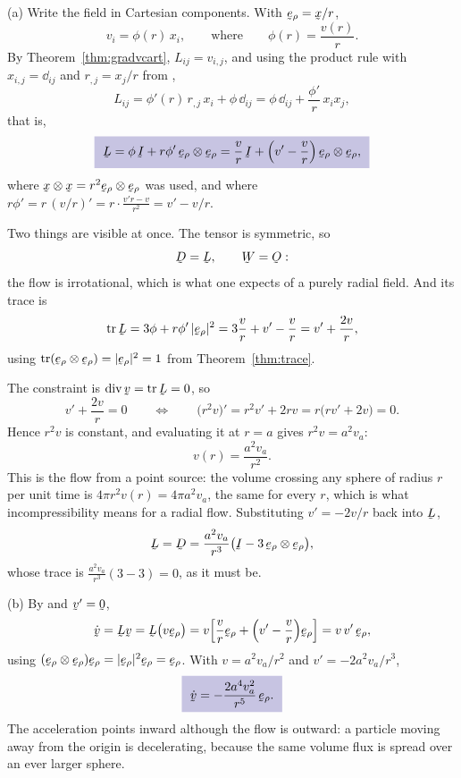 \begin{solution}
(a) Write the field in Cartesian components. With $\berho=\bx/r$,
\[
   v_{i}=\phi(r)\,x_{i},
   \qquad\text{where}\qquad
   \phi(r)=\frac{v(r)}{r} .
\]
By Theorem~\ref{thm:gradvcart}, $L_{ij}=v_{i,j}$, and using the product
rule with $x_{i,j}=\dd_{ij}$ and $r_{,j}=x_{j}/r$ from ,
\[
   L_{ij}=\phi'(r)\,r_{,j}\,x_{i}+\phi\,\dd_{ij}
   =\phi\,\dd_{ij}+\frac{\phi'}{r}\,x_{i}x_{j},
\]
that is,
\[
   \boxed{\ \bL=\phi\,\I+r\phi'\,\berho\otimes\berho
   =\frac{v}{r}\,\I+\Big(v'-\frac{v}{r}\Big)\,
   \berho\otimes\berho , \ }
\]
where $\bx\otimes\bx=r^{2}\berho\otimes\berho$ was used, and where
$r\phi'=r\,(v/r)'=r\cdot\frac{v'r-v}{r^{2}}=v'-v/r$.

Two things are visible at once. The tensor is symmetric, so
\[
   \bD=\bL,\qquad \bW=\Ob :
\]
the flow is irrotational, which is what one expects of a purely radial
field. And its trace is
\[
   \tr\bL=3\phi+r\phi'\,|\berho|^{2}
   =3\frac{v}{r}+v'-\frac{v}{r}=v'+\frac{2v}{r},
\]
using $\tr(\berho\otimes\berho)=|\berho|^{2}=1$ from
Theorem~\ref{thm:trace}.

The constraint  is $\dvg\bv=\tr\bL=0$, so
\[
   v'+\frac{2v}{r}=0
   \qquad\Longleftrightarrow\qquad
   \big(r^{2}v\big)'=r^{2}v'+2rv=r\Big(rv'+2v\Big)=0 .
\]
Hence $r^{2}v$ is constant, and evaluating it at $r=a$ gives
$r^{2}v=a^{2}v_{a}$:
\[
   \boxed{\ v(r)=\frac{a^{2}v_{a}}{r^{2}} . \ }
\]
This is the flow from a point source: the volume crossing any sphere of
radius $r$ per unit time is $4\pi r^{2}v(r)=4\pi a^{2}v_{a}$, the same
for every $r$, which is what incompressibility means for a radial flow.
Substituting $v'=-2v/r$ back into $\bL$,
\[
   \bL=\bD=\frac{a^{2}v_{a}}{r^{3}}
   \big(\I-3\,\berho\otimes\berho\big),
\]
whose trace is $\frac{a^{2}v_{a}}{r^{3}}(3-3)=0$, as it must be.

(b) By  and $\bv'=\bze$,
\[
   \dot\bv=\bL\bv=\bL\big(v\berho\big)
   =v\Big[\frac{v}{r}\berho+\Big(v'-\frac{v}{r}\Big)\berho\Big]
   =v\,v'\,\berho ,
\]
using $(\berho\otimes\berho)\berho=|\berho|^{2}\berho=\berho$. With
$v=a^{2}v_{a}/r^{2}$ and $v'=-2a^{2}v_{a}/r^{3}$,
\[
   \boxed{\ \dot\bv=-\frac{2a^{4}v_{a}^{2}}{r^{5}}\,\berho . \ }
\]
The acceleration points inward although the flow is outward: a particle
moving away from the origin is decelerating, because the same volume
flux is spread over an ever larger sphere.


\end{solution}
